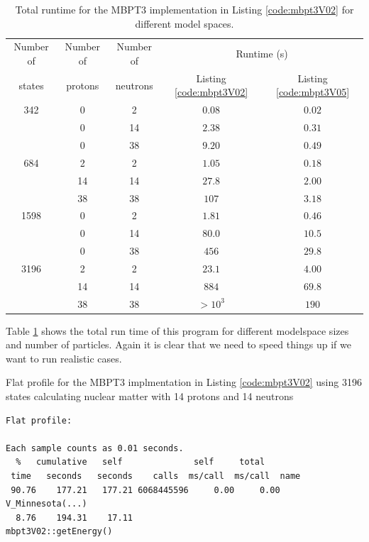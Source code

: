 \begin{table}
\caption{Total runtime for the MBPT3 implementation in Listing 
    \ref{code:mbpt3V02} for different model spaces.}\label{tab:mbpt3V02_runtime}
  \begin{center}
      \begin{tabular}{ccccc}
      \hline
      Number of & Number of & Number of & \multicolumn{2}{c}{Runtime (s)} \\
      states & protons & neutrons & Listing \ref{code:mbpt3V02} & Listing \ref{code:mbpt3V05} \\
      \hline
      \hline
        342 & 0 & 2 & $0.08$ & $0.02$\\
         & 0 & 14 & $2.38$ & $0.31$\\
         & 0 & 38 & $9.20$ & $0.49$\\
         684 & 2 & 2 & $1.05$ & $0.18$\\
         & 14 & 14 & $27.8$ & $2.00$\\
         & 38 & 38 & $107$ & $3.18$\\
         1598 & 0 & 2 & $1.81$ & $0.46$\\
         & 0 & 14 & $80.0$ & $10.5$\\
         & 0 & 38 & $456$ & $29.8$\\
         3196 & 2 & 2 & $23.1$ & $4.00$\\
         & 14 & 14 & $884$ & $69.8$\\
         & 38 & 38 & $> 10^3$ & $190$\\
      \hline
      \end{tabular}
  \end{center}
\end{table}

    
Table \ref{tab:mbpt3V02_runtime} shows the total run time of this program for different
modelspace sizes and number of particles. Again it is clear that we need to
speed things up if we want to run realistic cases.

\begin{table}[hbt]
\caption{Flat profile for the MBPT3 implmentation in Listing \ref{code:mbpt3V02}
using 3196 states calculating nuclear matter with 14 protons and 14 neutrons}\label{profile:mbpt3V02}
\begin{verbatim}
Flat profile:

Each sample counts as 0.01 seconds.
  %   cumulative   self              self     total           
 time   seconds   seconds    calls  ms/call  ms/call  name    
 90.76    177.21   177.21 6068445596     0.00     0.00  V_Minnesota(...)
  8.76    194.31    17.11                             mbpt3V02::getEnergy()
\end{verbatim}
\end{table}

